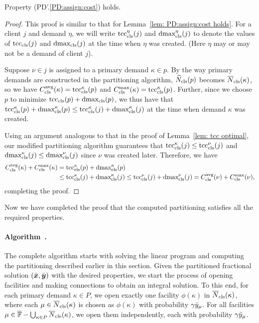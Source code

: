 
\begin{lemma}\label{lem: PD1: primary optimal}
  Property (PD'.\ref{PD:assign:cost}) holds.
\end{lemma}

\begin{proof}
This proof is similar to that for Lemma~\ref{lem: PD:assign:cost holds}.
For a client $j$ and demand $\eta$, we will write
$\mbox{\rm{tcc}}_{\text{cls}}^\eta(j)$ and $\mbox{\rm{dmax}}_{\text{cls}}^\eta(j)$ to denote the values of
$\mbox{\rm{tcc}}_{\text{cls}}(j)$ and $\mbox{\rm{dmax}}_{\text{cls}}(j)$ at the time when $\eta$
was created. (Here $\eta$ may or may not be a demand of client $j$).

Suppose $\nu \in j$ is assigned to a primary demand $\kappa \in p$.
By the way primary demands are constructed in the partitioning
algorithm, ${\widetilde N}_{\text{cls}}(p)$ becomes ${\overline{N}}_{\text{cls}}(\kappa)$, so we have
$C_{\text{cls}}^{{\mbox{\scriptsize\rm avg}}}(\kappa) = \mbox{\rm{tcc}}_{\text{cls}}^\kappa (p)$ and $C_{\text{cls}}^{\max}(\kappa) =
\mbox{\rm{tcc}}_{\text{cls}}^\kappa(p)$. Further, since we choose $p$ to minimize
$\mbox{\rm{tcc}}_{\text{cls}}(p) + \mbox{\rm{dmax}}_{\text{cls}}(p)$, we thus have that $\mbox{\rm{tcc}}_{\text{cls}}^\kappa(p) +
\mbox{\rm{dmax}}_{\text{cls}}^\kappa(p) \leq \mbox{\rm{tcc}}_{\text{cls}}^\kappa(j) + \mbox{\rm{dmax}}_{\text{cls}}^\kappa(j)$ at the
time when demand $\kappa$ was created.

Using an argument analogous to that in the proof of Lemma~\ref{lem: tcc optimal}, 
our modified partitioning algorithm guarantees that
  $\mbox{\rm{tcc}}_{\text{cls}}^{\kappa}(j) \leq \mbox{\rm{tcc}}_{\text{cls}}^{\nu}(j)$ and
  $\mbox{\rm{dmax}}_{\text{cls}}^{\kappa}(j) \leq \mbox{\rm{dmax}}_{\text{cls}}^{\nu}(j)$ since $\nu$ was
  created later.
  Therefore, we have
%
  \begin{align*}
    C_{\text{cls}}^{{\mbox{\scriptsize\rm avg}}}(\kappa) + C_{\text{cls}}^{\max}(\kappa) &= \mbox{\rm{tcc}}_{\text{cls}}^{\kappa}(p) +	\mbox{\rm{dmax}}_{\text{cls}}^{\kappa}(p) 
					\\
					&\leq \mbox{\rm{tcc}}_{\text{cls}}^{\kappa}(j) + \mbox{\rm{dmax}}_{\text{cls}}^{\kappa}(j) 
					\leq \mbox{\rm{tcc}}_{\text{cls}}^{\nu}(j) + \mbox{\rm{dmax}}_{\text{cls}}^{\nu}(j) 
					= C_{\text{cls}}^{{\mbox{\scriptsize\rm avg}}}(\nu) + C_{\text{cls}}^{\max}(\nu),
  \end{align*}
%
completing the proof.
\end{proof}


Now we have completed the proof that the computed partitioning satisfies
all the required properties. 


\paragraph{Algorithm~{\EBGS}.}
The complete algorithm starts with solving the linear program and
computing the partitioning described earlier in this section.
Given the partitioned fractional solution $(\bar{\boldsymbol{x}},
\bar{\boldsymbol{y}})$ with the desired properties, we start the process of opening
facilities and making connections to obtain an integral
solution. To this end, for each primary demand $\kappa\in P$,
we open exactly one facility $\phi(\kappa)$ in ${\overline{N}}_{\text{cls}}(\kappa)$,
where each $\mu\in{\overline{N}}_{\text{cls}}(\kappa)$ is chosen as $\phi(\kappa)$ with probability
$\gamma{\bar y}_{\mu}$. For all facilities
 $\mu\in\overline{\mathbb{F}} - \bigcup_{\kappa\in P}{\overline{N}}_{\text{cls}}(\kappa)$,
we open them independently, each with
probability $\gamma{\bar y}_{\mu}$. 

